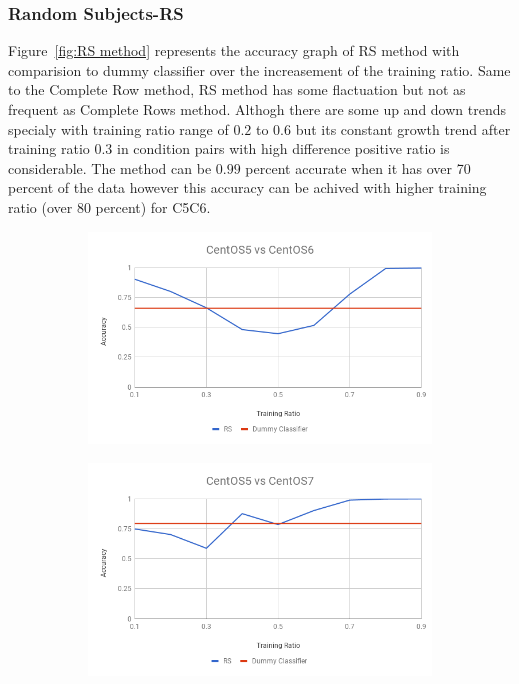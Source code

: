 \documentclass[10pt, conference, compsocconf]{IEEEtran}
\begin{document}
\subsubsection{Random Subjects-RS}
Figure~\ref{fig:RS method} represents
the accuracy graph of RS method with comparision to dummy
classifier over the increasement of the training ratio.
Same to the Complete Row method, RS method has some flactuation but not as frequent as Complete Rows method. Althogh there are some up and down trends specialy with training ratio range of $0.2$ to $0.6$ but its constant growth trend after training ratio $0.3$ in condition pairs with high difference positive ratio is considerable. The method can be $0.99$ percent accurate when it has over 70 percent of the data however this accuracy can be achived with higher training ratio (over 80 percent) for C5C6.  
\begin{figure}[h!]
        \centering
        \begin{subfigure}[b]{0.8\linewidth}
                \includegraphics[width=\columnwidth]{figures/ALS/RS-ALS-5vs6-PFS}
        \end{subfigure}
        \begin{subfigure}[b]{0.8\linewidth}
                \includegraphics[width=\columnwidth]{figures/ALS/RS-ALS-5vs7-PFS}

\end{subfigure}
\end{figure}
\end{document}

